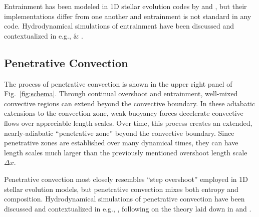 Entrainment has been modeled in 1D stellar evolution codes by \citet{staritsin_2013} and \citet{scott_etal_2021}, but their implementations differ from one another and entrainment is not standard in any code.
Hydrodynamical simulations of entrainment have been discussed and contextualized in e.g., \citet{meakin_arnett_2007} \& \citet{fuentes_cumming_2020}.


\subsection{Penetrative Convection}
The process of penetrative convection is shown in the upper right panel of Fig.~\ref{fig:schema}.
Through continual overshoot and entrainment, well-mixed convective regions can extend beyond the convective boundary.
In these adiabatic extensions to the convection zone, weak buoyancy forces decelerate convective flows over appreciable length scales.
Over time, this process creates an extended, nearly-adiabatic ``penetrative zone'' beyond the convective boundary.
Since penetrative zones are established over many dynamical times, they can have length scales much larger than the previously mentioned overshoot length scale $\Delta x$.

Penetrative convection most closely resembles ``step overshoot'' employed in 1D stellar evolution models, but penetrative convection mixes both entropy and composition.
Hydrodynamical simulations of penetrative convection have been discussed and contextualized in e.g., \citet{anders_etal_2021}, following on the theory laid down in \citet{roxburgh1978, roxburgh1989} and \citet{zahn1991}.
